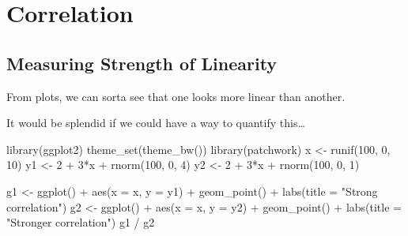 \documentclass[
  letterpaper,
  DIV=11,
  numbers=noendperiod]{scrreprt}
\newenvironment{Shaded}{\begin{snugshade}}{\end{snugshade}}
\newcommand{\AttributeTok}[1]{\textcolor[rgb]{0.40,0.45,0.13}{#1}}
\newcommand{\DecValTok}[1]{\textcolor[rgb]{0.68,0.00,0.00}{#1}}
\newcommand{\FunctionTok}[1]{\textcolor[rgb]{0.28,0.35,0.67}{#1}}
\newcommand{\NormalTok}[1]{\textcolor[rgb]{0.00,0.23,0.31}{#1}}
\newcommand{\OtherTok}[1]{\textcolor[rgb]{0.00,0.23,0.31}{#1}}
\newcommand{\SpecialCharTok}[1]{\textcolor[rgb]{0.37,0.37,0.37}{#1}}
\newcommand{\StringTok}[1]{\textcolor[rgb]{0.13,0.47,0.30}{#1}}
\begin{document}
\hypertarget{correlation}{%
\section{Correlation}\label{correlation}}

\hypertarget{measuring-strength-of-linearity}{%
\subsection{Measuring Strength of
Linearity}\label{measuring-strength-of-linearity}}

\vspace{1cm}

From plots, we can sorta see that one looks more linear than another.

It would be splendid if we could have a way to quantify this\ldots{}

\begin{Shaded}
\begin{Highlighting}[]
\FunctionTok{library}\NormalTok{(ggplot2)}
\FunctionTok{theme\_set}\NormalTok{(}\FunctionTok{theme\_bw}\NormalTok{())}
\FunctionTok{library}\NormalTok{(patchwork)}
\NormalTok{x }\OtherTok{\textless{}{-}} \FunctionTok{runif}\NormalTok{(}\DecValTok{100}\NormalTok{, }\DecValTok{0}\NormalTok{, }\DecValTok{10}\NormalTok{)}
\NormalTok{y1 }\OtherTok{\textless{}{-}} \DecValTok{2} \SpecialCharTok{+} \DecValTok{3}\SpecialCharTok{*}\NormalTok{x }\SpecialCharTok{+} \FunctionTok{rnorm}\NormalTok{(}\DecValTok{100}\NormalTok{, }\DecValTok{0}\NormalTok{, }\DecValTok{4}\NormalTok{)}
\NormalTok{y2 }\OtherTok{\textless{}{-}} \DecValTok{2} \SpecialCharTok{+} \DecValTok{3}\SpecialCharTok{*}\NormalTok{x }\SpecialCharTok{+} \FunctionTok{rnorm}\NormalTok{(}\DecValTok{100}\NormalTok{, }\DecValTok{0}\NormalTok{, }\DecValTok{1}\NormalTok{)}

\NormalTok{g1 }\OtherTok{\textless{}{-}} \FunctionTok{ggplot}\NormalTok{() }\SpecialCharTok{+} \FunctionTok{aes}\NormalTok{(}\AttributeTok{x =}\NormalTok{ x, }\AttributeTok{y =}\NormalTok{ y1) }\SpecialCharTok{+} \FunctionTok{geom\_point}\NormalTok{() }\SpecialCharTok{+}
    \FunctionTok{labs}\NormalTok{(}\AttributeTok{title =} \StringTok{"Strong correlation"}\NormalTok{)}
\NormalTok{g2 }\OtherTok{\textless{}{-}} \FunctionTok{ggplot}\NormalTok{() }\SpecialCharTok{+} \FunctionTok{aes}\NormalTok{(}\AttributeTok{x =}\NormalTok{ x, }\AttributeTok{y =}\NormalTok{ y2) }\SpecialCharTok{+} \FunctionTok{geom\_point}\NormalTok{() }\SpecialCharTok{+}
    \FunctionTok{labs}\NormalTok{(}\AttributeTok{title =} \StringTok{"Stronger correlation"}\NormalTok{)}
\NormalTok{g1 }\SpecialCharTok{/}\NormalTok{ g2}
\end{Highlighting}
\end{Shaded}
\end{document}
